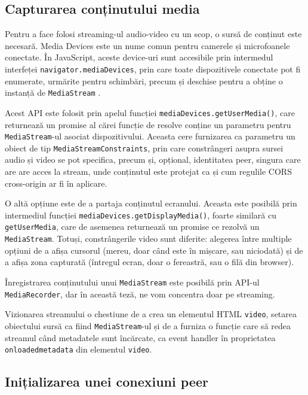 \subsection{Capturarea conținutului media}
\label{sec:ch2sec2subsec1}
\indent \par Pentru a face folosi streaming-ul audio-video cu un scop, o sursă de conținut este necesară. Media Devices este un nume comun pentru camerele și microfoanele conectate. În JavaScript, aceste device-uri sunt accesibile prin intermedul interfeței \texttt{navigator.mediaDevices}, prin care toate dispozitivele conectate pot fi enumerate, urmărite pentru schimbări, precum și deschise pentru a obține o instanță de \texttt{MediaStream} \cite{WebMedia2014}.
\indent \par Acest API este folosit prin apelul funcției \texttt{mediaDevices.getUserMedia()}, care returnează un promise al cărei funcție de resolve conține un parametru pentru \texttt{MediaStream}-ul asociat dispozitivului. Aceasta cere furnizarea ca parametru un obiect de tip \texttt{MediaStreamConstraints}, prin care constrângeri asupra sursei audio și video se pot specifica, precum și, opțional, identitatea peer, singura care are are acces la stream, unde conținutul este protejat ca și cum regulile CORS cross-origin ar fi în aplicare.
\indent \par O altă opțiune este de a partaja conținutul ecranului. Aceasta este posibilă prin intermediul funcției \texttt{mediaDevices.getDisplayMedia()}, foarte similară cu \texttt{getUserMedia}, care de asemenea returnează un promise ce rezolvă un \texttt{MediaStream}. Totuși, constrângerile video sunt diferite: alegerea între multiple opțiuni de a afișa cursorul (mereu, doar când este în mișcare, sau niciodată) și de a afișa zona capturată (întregul ecran, doar o fereastră, sau o filă din browser).
\indent \par Înregistrarea conținutului unui \texttt{MediaStream} este posibilă prin API-ul \texttt{MediaRecorder}, dar în această teză, ne vom concentra doar pe streaming.
\indent \par Vizionarea streamului o chestiune de a crea un elementul HTML \texttt{video}, setarea obiectului sursă ca fiind \texttt{MediaStream}-ul și de a furniza o funcție care să redea streamul când metadatele sunt încărcate, ca event handler în proprietatea \texttt{onloadedmetadata} din elementul \texttt{video}.

\subsection{Inițializarea unei conexiuni peer}
\label{sec:ch2sec2subsec2}

